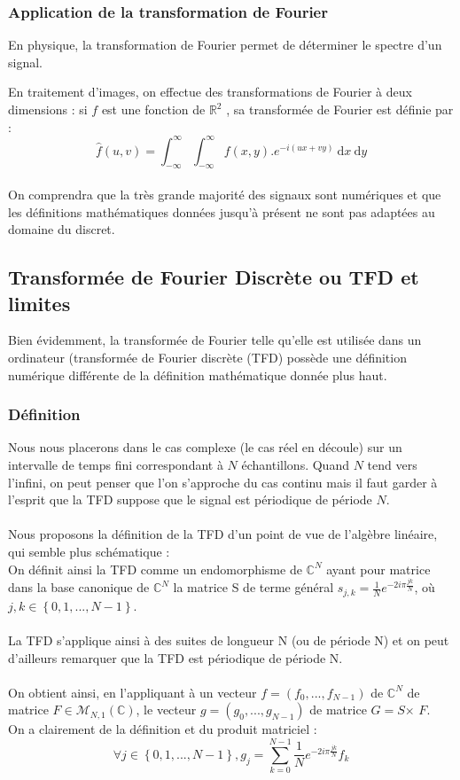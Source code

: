 \subsubsection{Application de la transformation de Fourier}
En physique, la transformation de Fourier permet de déterminer le spectre d'un signal. 

En traitement d'images, on effectue des transformations de Fourier à deux dimensions : si $f$ est une fonction de $\mathbb{R}^2$ , sa transformée de Fourier est définie par : $$\hat{f}(u,v)=\int_{-\infty}^{\infty}\int_{-\infty}^{\infty}f(x,y).e^{-i(ux+vy)}\:\mathrm{d}x\:\mathrm{d}y$$
\\
On comprendra que la très grande majorité des signaux sont numériques et que les définitions mathématiques données jusqu'à présent ne sont pas adaptées au domaine du discret.

\subsection{Transformée de Fourier Discrète ou TFD et limites}

Bien évidemment, la transformée de Fourier telle qu'elle est utilisée dans un ordinateur (transformée de Fourier discrète (TFD) possède une définition numérique différente de la définition mathématique donnée plus haut. 

\subsubsection{Définition}

Nous nous placerons dans le cas complexe (le cas réel en découle) sur un intervalle de temps fini correspondant à $N$ échantillons. Quand $N$ tend vers l'infini, on peut penser que l'on s'approche du cas continu mais il faut garder à l'esprit que la TFD suppose que le signal est périodique de période $N$.
\\ \\
Nous proposons la définition de la TFD d'un point de vue de l'algèbre linéaire, qui semble plus schématique :
\\
On définit ainsi la TFD comme un endomorphisme de $\mathbb{C}^N$ ayant pour matrice dans la base canonique de $\mathbb{C}^N$ la matrice S de terme général $s_{j,k}=\displaystyle{\frac{1}{N}e^{-2i\pi \frac{jk}{N}}}$, où $j,k\in \left\{0,1,...,N-1\right\}$. 
\\ \\
La TFD s'applique ainsi à des suites de longueur N (ou de période N) et on peut d'ailleurs remarquer que la TFD est périodique de période N.
\\ \\
On obtient ainsi, en l'appliquant à un vecteur $f=(f_0,...,f_{N-1})$ de $\mathbb{C}^N$ de matrice $F\in \mathcal{M}_{N,1}(\mathbb{C})$, le vecteur $g=(g_0,...,g_{N-1})$ de matrice $G=S$$\times$ $F$.
\\ On a clairement de la définition et du produit matriciel : 
$$\forall j\in \left\{0,1,...,N-1\right\}, g_j=\displaystyle\sum_{k=0}^{N-1}\displaystyle{\frac{1}{N}e^{-2i\pi \frac{jk}{N}}}f_k$$

